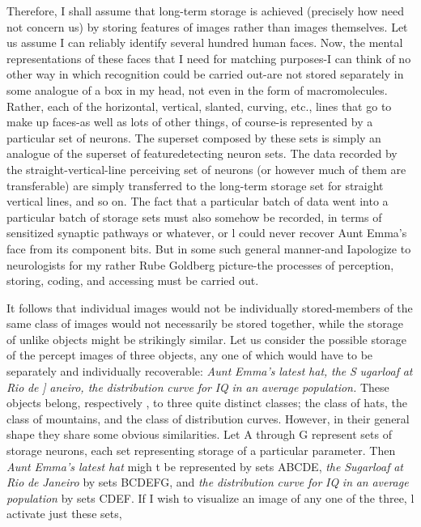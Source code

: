 Therefore, I shall assume that long-term storage is achieved (precisely how need not concern us) by storing features of images rather than images themselves. Let us assume I can reliably identify several hundred human faces. Now, the mental representations of these faces that I need for matching purposes-I can think of no other way in which recognition could be carried out-are not stored separately in some analogue of a box in my head, not even in the form of macro\-molecules. Rather, each of the horizontal, vertical, slanted, curving, etc., lines that go to make up faces-as well as lots of other things, of course-is represented by a particular set of neurons. The superset
composed by these sets is simply an analogue of the superset of feature\-detecting neuron sets. The data recorded by the straight-vertical-line perceiving set of neurons (or however much of them are transferable) are simply transferred to the long-term storage set for straight vertical lines, and so on. The fact that a particular batch of data went into a particular batch of storage sets must also somehow be recorded, in terms of sensitized synaptic pathways or whatever, or l could never recover Aunt Emma's face from its component bits. But in some such general manner-and Iapologize to neurologists for my rather Rube Goldberg picture-the processes of perception, storing, coding, and accessing must be carried out.

It follows that individual images would not be individually stored-members of the same class of images would not necessarily be stored together, while the storage of unlike objects might be strikingly similar. Let us consider the possible storage of the percept images of three objects, any one of which would have to be separately and individually recoverable: \textit{Aunt} \textit{Emma's} \textit{latest} \textit{hat,} \textit{the} \textit{S} \textit{ugarloaf} \textit{at} \textit{Rio} \textit{de} \textit{]} \textit{aneiro, the} \textit{distribution} \textit{curve} \textit{for} \textit{IQ} \textit{in} \textit{an} \textit{average} \textit{population.} These objects belong, respectively , to three quite distinct classes; the class of hats, the class of mountains, and the class of distribution curves. However, in their general shape they share some obvious simi\-larities. Let A through G represent sets of storage neurons, each set representing storage of a particular parameter. Then \textit{Aunt} \textit{Emma's latest} \textit{hat} migh t be represented by sets ABCDE, \textit{the} \textit{Sugarloaf} \textit{at} \textit{Rio} \textit{de} \textit{Janeiro} by sets BCDEFG, and \textit{the} \textit{distribution} \textit{curve} \textit{for} \textit{IQ} \textit{in} \textit{an} \textit{average} \textit{population} by sets CDEF. If I wish to visualize an image of any one of the three, l activate just these sets,

